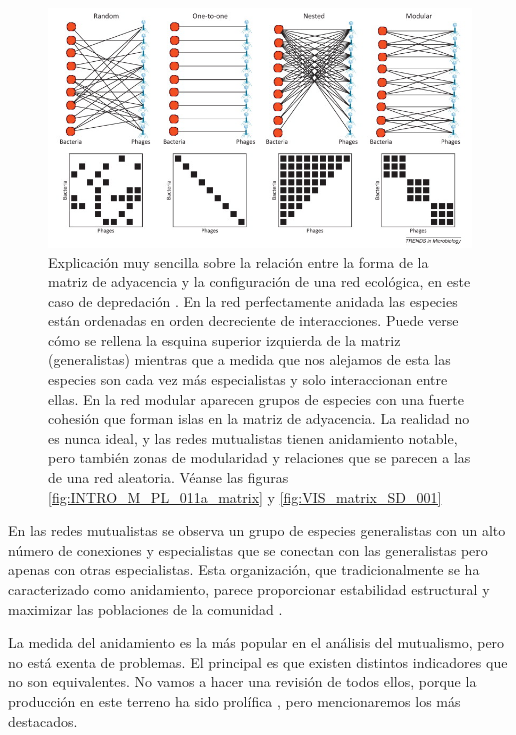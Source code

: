 \begin{figure}[h!]
\centering
\includegraphics[scale=0.75]{Figures/ESTATICA_redes_ejemplos.png}
\caption{Explicación muy sencilla sobre la relación entre la forma de la matriz de adyacencia y la configuración de una red ecológica, en este caso de depredación \cite{weitz2013phage}. En la red perfectamente anidada las especies están ordenadas en orden decreciente de interacciones. Puede verse cómo se rellena la esquina superior izquierda de la matriz (generalistas) mientras que a medida que nos alejamos de esta las especies son cada vez más especialistas y solo interaccionan entre ellas. En la red modular aparecen grupos de especies con una fuerte cohesión que forman islas en la matriz de adyacencia. La realidad no es nunca ideal, y las redes mutualistas tienen anidamiento notable, pero también zonas de modularidad y relaciones que se parecen a las de una red aleatoria. Véanse las figuras \ref{fig:INTRO_M_PL_011a_matrix} y \ref{fig:VIS_matrix_SD_001}}
\label{fig:ESTATICA_redes_ejemplos}
\end{figure}


En las redes mutualistas se observa un grupo de especies generalistas con un alto número de conexiones y especialistas que se conectan con las generalistas pero apenas con otras especialistas. Esta organización, que tradicionalmente se ha caracterizado como anidamiento, parece proporcionar estabilidad estructural y maximizar las poblaciones de la comunidad \cite{memmott2004tolerance,bastolla2009,thebault2010stability,suweis2013emergence}. 

La medida del anidamiento es la más popular en el análisis del mutualismo, pero no está exenta de problemas. El principal es que existen distintos indicadores que no son equivalentes. No vamos a hacer una revisión de todos ellos, porque la producción en este terreno ha sido prolífica \cite{ulrich2009consumer}, pero mencionaremos los más destacados. 

